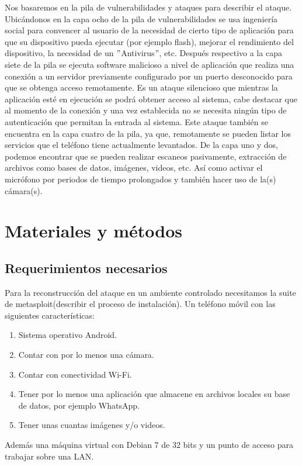 \documentclass[12pt,twocolumn]{report}
\begin{document}
Nos basaremos en la pila de vulnerabilidades y ataques para describir el ataque. Ubicándonos en la capa ocho de la pila de 
vulnerabilidades se usa ingeniería social para 
convencer al usuario de la necesidad de cierto tipo de aplicación para que su dispositivo pueda ejecutar (por ejemplo flash), 
mejorar el rendimiento del dispositivo, la necesidad de un $"$Antivirus$"$, etc. Después respectivo a la capa siete de la pila 
se ejecuta software malicioso a nivel de aplicación que realiza una conexión a un servidor previamente configurado por un puerto 
desconocido para que se obtenga acceso remotamente. Es un ataque silencioso que mientras la aplicación esté en ejecución se podrá
obtener acceso al sistema, cabe destacar que al momento de la conexión y una vez establecida no se necesita ningún tipo de 
autenticación que permitan la entrada al sistema. Este ataque también se encuentra en la capa cuatro de la pila, ya que, 
remotamente se pueden listar los servicios que el teléfono tiene actualmente levantados. De la capa uno y dos, podemos encontrar 
que se pueden realizar escaneos pasivamente, extracción de archivos como bases de datos, imágenes, videos, etc. Así como activar
el micrófono por periodos de tiempo prolongados y también hacer uso de la(s) cámara(s).

\section{Materiales y métodos}
\subsection{Requerimientos necesarios}
Para la reconstrucción del ataque en un ambiente controlado necesitamos la suite de metasploit(describir el proceso de 
instalación). Un teléfono móvil con las siguientes características:
\begin{enumerate}
\item Sistema operativo Android.
\item Contar con por lo menos una cámara.
\item Contar con conectividad Wi-Fi.
\item Tener por lo menos una aplicación que almacene en archivos locales su base de datos, por ejemplo WhatsApp.
\item Tener unas cuantas imágenes y/o videos.
\end{enumerate}

Además una máquina virtual con Debian 7 de 32 bits y un punto de acceso para trabajar sobre una LAN.
\end{document}
